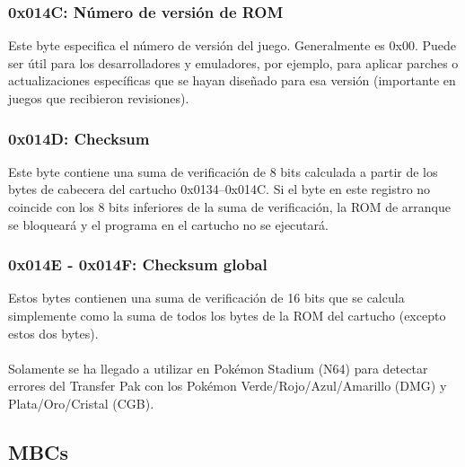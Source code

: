 \subsubsection{0x014C: Número de versión de ROM}
Este byte especifica el número de versión del juego. Generalmente es 0x00. Puede ser útil para los desarrolladores y emuladores, por ejemplo, para aplicar parches o actualizaciones específicas que se hayan diseñado para esa versión (importante en juegos que recibieron revisiones).

\subsubsection{0x014D: Checksum}
Este byte contiene una suma de verificación de 8 bits calculada a partir de los bytes de cabecera del cartucho 0x0134–0x014C. Si el byte en este registro no coincide con los 8 bits inferiores de la suma de verificación, la ROM de arranque se bloqueará y el programa en el cartucho no se ejecutará.

\subsubsection{0x014E - 0x014F: Checksum global}
Estos bytes contienen una suma de verificación de 16 bits que se calcula simplemente como la suma de todos los bytes de la ROM del cartucho (excepto estos dos bytes).
\\\\
Solamente se ha llegado a utilizar en Pokémon Stadium (N64) para detectar errores del Transfer Pak con los Pokémon Verde/Rojo/Azul/Amarillo (DMG) y Plata/Oro/Cristal (CGB).

\subsection{MBCs}



\cleardoublepage
